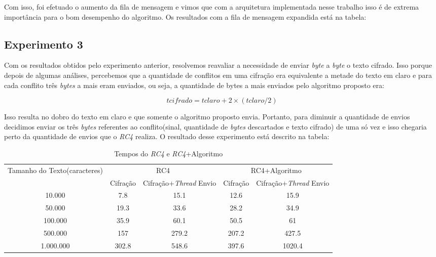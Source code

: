 Com isso, foi efetuado o aumento da fila de mensagem e vimos que com a arquitetura implementada nesse trabalho isso é de extrema importância para o bom desempenho do algoritmo. Os resultados com a fila de mensagem expandida está na tabela:


\subsection{Experimento 3}

Com os resultados obtidos pelo experimento anterior, resolvemos reavaliar a necessidade de enviar \textit{byte} a \textit{byte} o texto cifrado. Isso porque depois de algumas análises, percebemos que a quantidade de conflitos em uma cifração era equivalente a metade do texto em claro e para cada conflito três \textit{bytes} a mais eram enviados, ou seja, a quantidade de bytes a mais enviados pelo algoritmo proposto era:

\begin{equation}
	tcifrado = tclaro + 2 \times (tclaro/2)
\end{equation}

Isso resulta no dobro do texto em claro e que somente o algoritmo proposto envia. Portanto, para diminuir a quantidade de envios decidimos enviar os três \textit{bytes} referentes ao conflito(sinal, quantidade de \textit{bytes} descartados e texto cifrado) de uma só vez e isso chegaria perto da quantidade de envios que o \textit{RC4} realiza. O resultado desse experimento está descrito na tabela:

\begin{table}[h]
\centering
\begin{tabular}{|c|c|c|c|c|}
\hline
\multirow{2}{*}{\centering Tamanho do Texto(caracteres)} & \multicolumn{2}{c|}{RC4}         & \multicolumn{2}{c|}{RC4+Algoritmo} \\ \cline{2-5} 
                                              & Cifração & Cifração+\textit{Thread} Envio & Cifração  & Cifração+\textit{Thread} Envio   \\ \hline
10.000                                        & 7.8      & 15.1                  & 12.6      & 15.9                   \\ \hline
50.000                                        & 19.3     & 33.6                  & 28.2      & 34.9                   \\ \hline
100.000                                       & 35.9     & 60.1                  & 50.5      & 61                     \\ \hline
500.000                                       & 157      & 279.2                 & 207.2     & 427.5                  \\ \hline
1.000.000                                     & 302.8    & 548.6                 & 397.6     & 1020.4                 \\ \hline
\end{tabular}
\caption{Tempos do \textit{RC4} e \textit{RC4}+Algoritmo}
\end{table}

